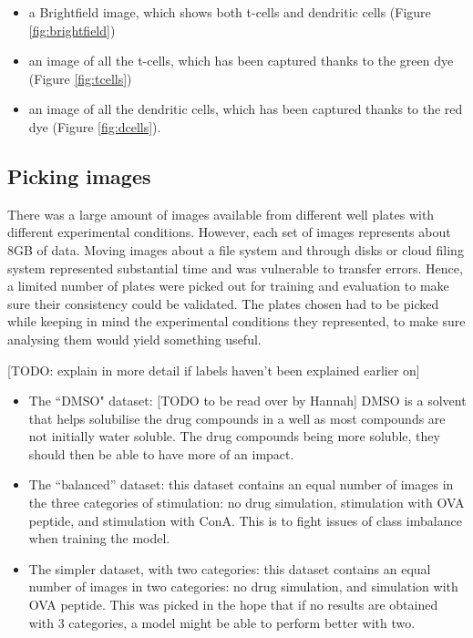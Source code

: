 \documentclass{l4proj}
\begin{document}
\begin{itemize}
    \item a Brightfield image, which shows both t-cells and dendritic cells (Figure \ref{fig:brightfield})
    \item an image of all the t-cells, which has been captured thanks to the green dye (Figure \ref{fig:tcells})
    \item an image of all the dendritic cells, which has been captured thanks to the red dye (Figure \ref{fig:dcells}).
\end{itemize}


\subsection{Picking images}

There was a large amount of images available from different well plates with different experimental conditions. However, each set of images represents about 8GB of data. Moving images about a file system and through disks or cloud filing system represented substantial time and was vulnerable to transfer errors. Hence, a limited number of plates were picked out for training and evaluation to make sure their consistency could be validated. The plates chosen had to be picked while keeping in mind the experimental conditions they represented, to make sure analysing them would yield something useful.

[TODO: explain in more detail if labels haven't been explained earlier on]
\begin{itemize}
    \item The ``DMSO" dataset: [TODO to be read over by Hannah] DMSO is a solvent that helps solubilise the drug compounds in a well as most compounds are not initially water soluble. The drug compounds being more soluble, they should then be able to have more of an impact.
    \item The ``balanced” dataset: this dataset contains an equal number of images in the three categories of stimulation: no drug simulation, stimulation with OVA peptide, and stimulation with ConA. This is to fight issues of class imbalance when training the model.
    \item The simpler dataset, with two categories: this  dataset contains an equal number of images in two categories: no drug simulation, and simulation with OVA peptide. This was picked in the hope that if no results are obtained with 3 categories, a model might be able to perform better with two.
\end{itemize}
\end{document}
